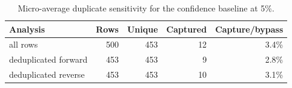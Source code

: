 \begin{table}[t]
\centering
\caption{Micro-average duplicate sensitivity for the confidence baseline at 5\%.}
\label{tab:duplicate-sensitivity}
\scriptsize
\begin{tabular}{lrrrr}
\toprule
Analysis & Rows & Unique & Captured & Capture/bypass \\
\midrule
all rows & 500 & 453 & 12 & 3.4\% \\
deduplicated forward & 453 & 453 & 9 & 2.8\% \\
deduplicated reverse & 453 & 453 & 10 & 3.1\% \\
\bottomrule
\end{tabular}
\end{table}
